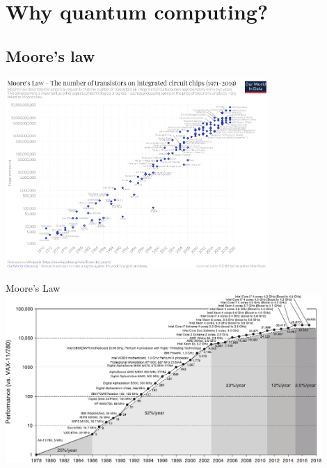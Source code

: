 \section{Why quantum computing?}
\begingroup
\nologo
\subsection{Moore's law}
\begin{frame}{}
    \centering
    \includegraphics[width=0.75\textwidth]{pics/introduction/Transistor-Count-over-time-to-2018.png}
\end{frame}
\begin{frame}{}
    \centering
    \Large Moore's Law\\
    \includegraphics[width=0.9\textwidth]{pics/introduction/computer_arch.pdf}
\end{frame}
